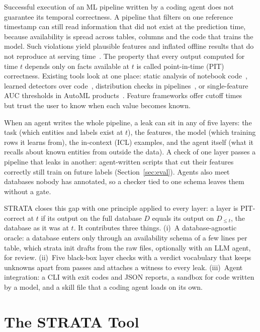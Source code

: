 \documentclass[10pt,conference]{IEEEtran}
\newcommand{\tool}{STRATA}
\newcommand{\Dfull}{D}
\newcommand{\Dcut}{D_{\le t}}
\begin{document}
Successful execution of an ML pipeline written by a coding agent does not
guarantee its temporal correctness. A pipeline that filters on one reference
timestamp can still read information that did not exist at the prediction
time, because availability is spread across tables, columns and the code
that trains the model. Such violations yield plausible features and inflated
offline results that do not reproduce at serving
time~\cite{kaufman2011,kapoor2023}. The property that every output computed
for time $t$ depends only on facts available at $t$ is called
point-in-time (PIT) correctness. Existing tools look at one place:
static analysis of notebook code~\cite{yang2022}, learned detectors over
code~\cite{peerj2025}, distribution checks in pipelines~\cite{mlinspect},
or single-feature AUC thresholds in AutoML products~\cite{datarobot,h2o}.
Feature frameworks offer cutoff times~\cite{dfs} but trust the user to know
when each value becomes known.

When an agent writes the whole pipeline, a leak can sit in any of five
layers: the task (which entities and labels exist at $t$), the
features, the model (which training rows it learns from), the
in-context (ICL) examples, and the agent itself (what it
recalls about known entities from outside the data). A check of one
layer passes a pipeline that leaks in another: agent-written scripts that
cut their features correctly still train on future labels
(Section~\ref{sec:eval}). Agents also meet databases nobody has annotated,
so a checker tied to one schema leaves them without a gate.

\tool{} closes this gap with one principle applied to every layer: a layer
is PIT-correct at $t$ if its output on the full database $\Dfull$ equals its
output on $\Dcut$, the database as it was at $t$. It contributes three
things. (i)~A database-agnostic oracle: a database enters only through an
availability schema of a few lines per table, which strata init
drafts from the raw files, optionally with an LLM agent, for review.
(ii)~Five black-box layer checks with a verdict vocabulary that keeps
unknowns apart from passes and attaches a witness to every leak.
(iii)~Agent integration: a CLI with exit codes and JSON reports, a
sandbox for code written by a model, and a skill file that a coding agent
loads on its own.

\section{The \tool{} Tool}
\end{document}
